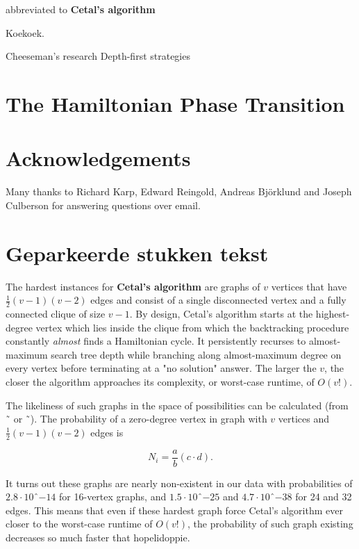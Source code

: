 


abbreviated to \textbf{Cetal's algorithm}

Koekoek\cite{bellman1962dynamic}.

Cheeseman's research
Depth-first strategies

\section{The Hamiltonian Phase Transition}

\section{Acknowledgements}
Many thanks to Richard Karp, Edward Reingold, Andreas Bj\"orklund and Joseph Culberson for answering questions over email.


\section{Geparkeerde stukken tekst}

The hardest instances for \textbf{Cetal's algorithm} are graphs of $v$ vertices that have $\frac{1}{2}(v-1)(v-2)$ edges and consist of a single disconnected vertex and a fully connected clique of size $v-1$. By design, Cetal's algorithm starts at the highest-degree vertex which lies inside the clique from which the backtracking procedure constantly \textit{almost} finds a Hamiltonian cycle. It persistently recurses to almost-maximum search tree depth while branching along almost-maximum degree on every vertex before terminating at a "no solution" answer. The larger the $v$, the closer the algorithm approaches its complexity, or worst-case runtime, of $O(v!)$.

The likeliness of such graphs in the space of possibilities can be calculated (from ˜\cite{erdos1960evolution} or ˜\cite{HopcroftKannan2014DataScience}). The probability of a zero-degree vertex in graph with $v$ vertices and $\frac{1}{2}(v-1)(v-2)$ edges is

\begin{equation} 
N_i = \frac{a}{b}(c \cdot d).
\end{equation}

It turns out these graphs are nearly non-existent in our data with probabilities of $2.8 \cdot 10ˆ{-14}$ for 16-vertex graphs, and $1.5 \cdot 10ˆ{-25}$ and $4.7 \cdot 10ˆ{-38}$ for 24 and 32 edges. This means that even if these hardest graph force Cetal's algorithm ever closer to the worst-case runtime of $O(v!)$, the probability of such graph existing decreases so much faster that hopelidoppie.

